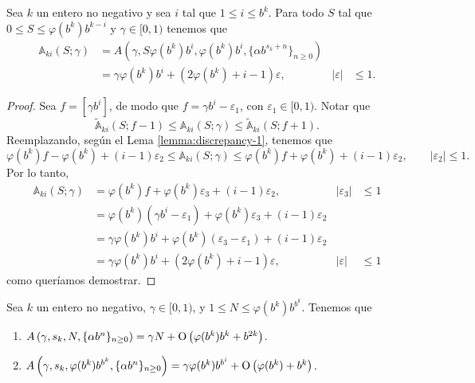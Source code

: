 \begin{lemma}
	\label{lemma:discrepancy-2}
	Sea $k$ un entero no negativo y sea $i$ tal que $1 \leq i \leq b^k$.
	Para todo $S$ tal que $0 \leq S \leq \varphi(b^k)b^{k-i}$ y
	$\gamma \in [0, 1)$ tenemos que
	\begin{align*}
		\mathbb{A}_{ki}(S;\gamma)
		&= A\left(\gamma, S \varphi(b^k) b^i, \varphi(b^k) b^i,
			\lbrace \alpha b^{s_k + n} \rbrace_{n\geq0} \right) \\
		& = \gamma\varphi(b^k)b^i + (2\varphi(b^k) + i - 1)\varepsilon,
			& \vert\varepsilon\vert &\leq 1.
	\end{align*}
\end{lemma}

\begin{proof}
Sea $f = [\gamma b^i]$, de modo que $f = \gamma b^i - \varepsilon_1$, con
$\varepsilon_1 \in [0, 1)$. Notar que
\[
	\tilde{\mathbb{A}}_{ki}(S;f-1) \leq \mathbb{A}_{ki}(S;\gamma)
	\leq \tilde{\mathbb{A}}_{ki}(S;f+1).
\]
Reemplazando, según el Lema \ref{lemma:discrepancy-1}, tenemos que
\[
	\varphi(b^k)f - \varphi(b^k) + (i - 1)\varepsilon_2
	\leq \mathbb{A}_{ki}(S;\gamma)
	\leq \varphi(b^k)f + \varphi(b^k) + (i - 1)\varepsilon_2,
	\qquad \vert \varepsilon_2 \vert \leq 1.
\]
Por lo tanto,
\begin{align*}
	\mathbb{A}_{ki}(S;\gamma)
		&= \varphi(b^k)f + \varphi(b^k)\varepsilon_3 + (i - 1)\varepsilon_2,
			& \vert \varepsilon_3 \vert &\leq 1 \\
		&= \varphi(b^k)(\gamma b^i - \varepsilon_1) + \varphi(b^k)\varepsilon_3
			+ (i - 1)\varepsilon_2 \\
		&= \gamma\varphi(b^k)b^i + \varphi(b^k)(\varepsilon_3 - \varepsilon_1)
			+ (i - 1)\varepsilon_2 \\
		&= \gamma\varphi(b^k)b^i + (2\varphi(b^k) + i - 1)\varepsilon,
			& \vert\varepsilon\vert & \leq 1
\end{align*}
como queríamos demostrar.
\end{proof}

\begin{lemma}
	\label{lemma:discrepancy-3}
	Sea $k$ un entero no negativo, $\gamma \in [0, 1)$,
	y $1 \leq N \leq \varphi(b^k)b^{b^k}$.
	Tenemos que
	\begin{enumerate}
		\item $ A\left(\gamma, s_k, N, \lbrace \alpha b^{n} \rbrace_{n\geq0} \right) =
			\gamma N + \operatorname{O} \left( \varphi(b^k)b^{k} + b^{2k} \right)$.
		\item $ A\left(\gamma, s_k, \varphi(b^k)b^{b^k}, \lbrace \alpha b^{n} \rbrace_{n\geq0} \right) =
			\gamma\varphi(b^k)b^{b^i} + \operatorname{O}\left(\varphi(b^k) + b^k\right)$.
	\end{enumerate}
\end{lemma}

